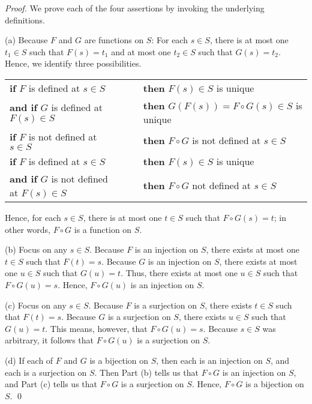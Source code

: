 \begin{proof}
We prove each of the four assertions by invoking the underlying
definitions.

\noindent (a)
%
Because $F$ and $G$ are functions on $S$: For each $s \in S$, there is
at most one $t_1 \in S$ such that $F(s) = t_1$ and at most one $t_2
\in S$ such that $G(s) = t_2$.  Hence, we identify three
possibilities.

\smallskip

\begin{tabular}{llll}
\hline
{\bf if}
$F$ is defined at $s \in S$  & & & {\bf then} $F(s) \in S$ is unique \\
{\bf and if} $G$ is defined at $F(s) \in S$ & & & {\bf then} $G(F(s))
= F \circ G(s) \in S$ is unique \\
\hline
{\bf if}
$F$ is not defined at $s \in S$ & & & {\bf then} $F \circ G$ is not
defined at $s \in S$ \\
\hline 
{\bf if}
$F$ is defined at $s \in S$ & & & {\bf then} $F(s) \in S$ is unique \\
{\bf and if} $G$ is not defined at $F(s) \in S$ & & & {\bf then}
$F \circ G$ not defined at $s \in S$ \\
\hline
\end{tabular}

\smallskip

\noindent
Hence, for each $s \in S$, there is at most one $t \in S$ such that $F
\circ G(s) = t$; in other words, $F \circ G$ is a function on $S$.

\medskip

\noindent (b)
%
Focus on any $s \in S$.  Because $F$ is an injection on $S$, there
exists at most one $t \in S$ such that $F(t) = s$.  Because $G$ is an
injection on $S$, there exists at most one $u \in S$ such that $G(u) =
t$.  Thus, there exists at most one $u \in S$ such that $F \circ G(u)
= s$.  Hence, $F \circ G(u)$ is an injection on $S$.

\medskip

\noindent (c)
%
Focus on any $s \in S$.  Because $F$ is a surjection on $S$, there
exists $t \in S$ such that $F(t) = s$.  Because $G$ is a surjection on
$S$, there exists $u \in S$ such that $G(u) = t$.  This means,
however, that $F \circ G(u) = s$.  Because $s \in S$ was arbitrary, it
follows that $F \circ G(u)$ is a surjection on $S$.

\medskip

\noindent (d)
%
If each of $F$ and $G$ is a bijection on $S$, then each is an
injection on $S$, and each is a surjection on $S$.  Then Part (b)
tells us that $F \circ G$ is an injection on $S$, and Part (c) tells
us that $F \circ G$ is a surjection on $S$.  Hence, $F \circ G$ is a
bijection on $S$.  \qed
\end{proof}


